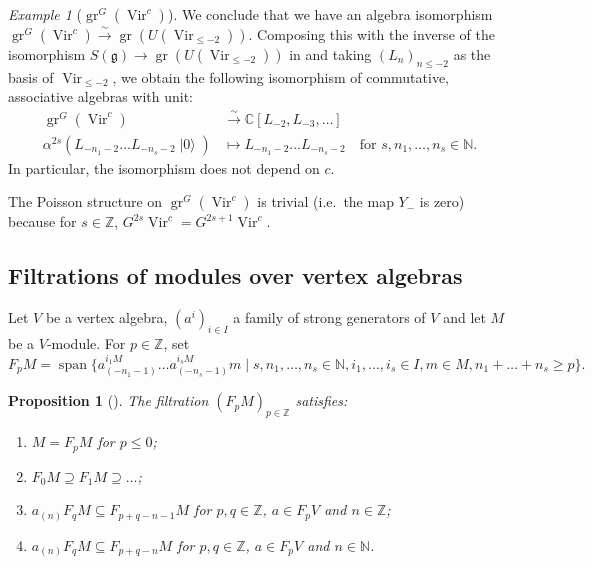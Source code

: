 \documentclass[a4paper, 12pt, reqno]{amsart}
\newtheorem{proposition}[theorem]{Proposition}
\theoremstyle{remark}
\newtheorem{example}[theorem]{Example}
\numberwithin{equation}{subsection}
\DeclareMathOperator{\Vir}{Vir}
\DeclareMathOperator{\gr}{gr}
\DeclareMathOperator{\vspan}{span}
\DeclareMathOperator{\vac}{|0\rangle}
\begin{document}
\begin{example}[$\gr^G(\Vir^c)$]
  We conclude that we have an algebra isomorphism $\gr^G(\Vir^c) \xrightarrow{\sim} \gr(U(\Vir_{\le -2}))$.
  Composing this with the inverse of the isomorphism $S(\mathfrak{g}) \to \gr(U(\Vir_{\le -2}))$ in  and taking $(L_n)_{n \le -2}$ as the basis of $\Vir_{\le -2}$, we obtain the following isomorphism of commutative, associative algebras with unit:
  \begin{align*}
  \gr^G(\Vir^c) &\xrightarrow{\sim} \mathbb{C}[L_{-2}, L_{-3}, \dots] \\
  \alpha^{2s}(L_{-n_1 - 2}\dots L_{-n_s - 2}\vac) &\mapsto L_{-n_1 - 2}\dots L_{-n_s - 2} \quad \text{for }s, n_1, \dots, n_s \in \mathbb{N}.
  \end{align*}
  In particular, the isomorphism does not depend on $c$.

  The Poisson structure on $\gr^G(\Vir^c)$ is trivial (i.e.\ the map $Y_-$ is zero) because for $s \in \mathbb{Z}$, $G^{2s}\Vir^c = G^{2s + 1}\Vir^c$.
\end{example}

\subsection{Filtrations of modules over vertex algebras}
\label{sec:filtr-modul-over}

Let $V$ be a vertex algebra, $(a^i)_{i \in I}$ a family of strong generators of $V$ and let $M$ be a $V$-module.
For $p \in \mathbb{Z}$, set
\begin{equation*}
  F_pM = \vspan \{a^{i_1M}_{(-n_1 - 1)}\dots a^{i_sM}_{(-n_s - 1)}m \mid s, n_1, \dots, n_s \in \mathbb{N}, i_1, \dots, i_s \in I, m \in M, n_1 + \dots + n_s \ge p\}.
\end{equation*}

\begin{proposition}[{\cite{li_abelianizing_2005}}]
  \label{prp:10}
  The filtration $(F_pM)_{p \in \mathbb{Z}}$ satisfies:
  \begin{enumerate}
  \item $M = F_pM$ for $p \le 0$;
  \item $F_0M \supseteq F_1M \supseteq \dots$;
  \item $a_{(n)}F_qM \subseteq F_{p + q - n - 1}M$ for $p, q \in \mathbb{Z}$, $a \in F_pV$ and $n \in \mathbb{Z}$;
  \item $a_{(n)}F_qM \subseteq F_{p + q - n}M$ for $p, q \in \mathbb{Z}$, $a \in F_pV$ and $n \in \mathbb{N}$.
  \end{enumerate}
\end{proposition}
\end{document}
